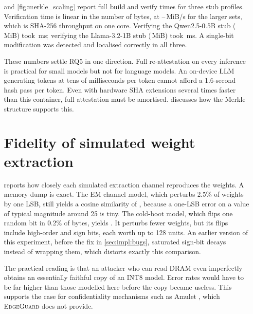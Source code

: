  and \cref{fig:merkle_scaling} report full build and verify times for three stub
profiles. Verification time is linear in the number of bytes, at \MerkThrMin{}--\MerkThrMax{}\,MiB/s
for the larger sets, which is SHA-256 throughput on one core. Verifying the Qwen2.5-0.5B stub
(\MerkSizeQwenPPB{}\,MiB) took \MerkVerQwenPPB{}\,ms; verifying the Llama-3.2-1B stub
(\MerkSizeLlamaPB{}\,MiB) took \MerkVerLlamaPB{}\,ms. A single-bit modification was detected and
localised correctly in all three.

These numbers settle RQ5 in one direction. Full re-attestation on every inference is practical
for small models but not for language models. An on-device LLM generating tokens at tens of
milliseconds per token cannot afford a 1.6-second hash pass per token. Even with hardware SHA
extensions several times faster than this container, full attestation must be amortised.
 discusses how the Merkle structure supports this.

\section{Fidelity of simulated weight extraction}
\label{sec:eval:extraction}

\begin{table}[t]
\centering
\caption{Cosine similarity between the dequantized extracted weights and the originals, averaged
over the tiny profile's tensors and \NSeeds{} seeds.}
\label{tab:extraction}
\small

\end{table}

 reports how closely each simulated extraction channel reproduces the
weights. A memory dump is exact. The EM channel model, which perturbs 2.5\% of weights by one
LSB, still yields a cosine similarity of \FidEmSideChannel{}, because a one-LSB error on a value
of typical magnitude around 25 is tiny. The cold-boot model, which flips one random bit in 0.2\%
of bytes, yields \FidColdBoot{}. It perturbs fewer weights, but its flips include high-order
and sign bits, each worth up to 128 units. An earlier version of this experiment, before the fix
in \cref{sec:impl:bugs}, saturated sign-bit decays instead of wrapping them, which distorts
exactly this comparison.

The practical reading is that an attacker who can read DRAM even imperfectly obtains an
essentially faithful copy of an INT8 model. Error rates would have to be far higher than those
modelled here before the copy became useless. This supports the case for confidentiality
mechanisms such as Amulet \cite{mao2025amulet}, which \textsc{EdgeGuard} does not provide.

